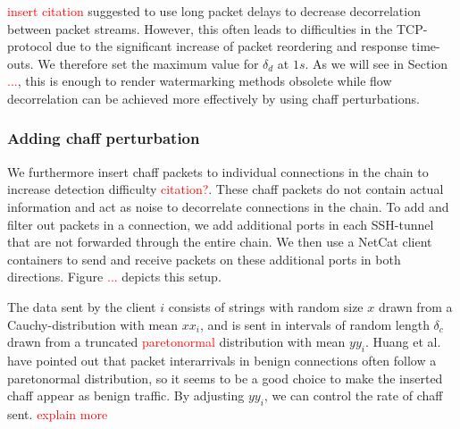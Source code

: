 \documentclass[runningheads]{llncs}\usepackage[]{graphicx}\usepackage[]{color}
\begin{document}
\textcolor{red}{insert citation} suggested to use long packet delays to decrease decorrelation between packet streams. However, this often leads to difficulties in the TCP-protocol due to the significant increase of packet reordering and response time-outs. We therefore set the maximum value for  $\delta_d$  at $1s$. As we will see in Section \textcolor{red}{...}, this is enough to render watermarking methods obsolete while flow decorrelation can be achieved more effectively by using chaff perturbations. 





\subsubsection{Adding chaff perturbation}\label{Sec:chaff_desc}

We furthermore insert chaff packets to individual connections in the chain to increase detection difficulty \textcolor{red}{citation?}. These chaff packets do not contain actual information and act as noise to decorrelate connections in the chain. To add and filter out packets in a connection, we add additional ports in each SSH-tunnel that are not forwarded through the entire chain.
We then use a NetCat client containers to send and receive packets on these additional ports in both directions. Figure \textcolor{red}{...} depicts this setup. 

The data sent by the client $i$ consists of strings with random size $x$ drawn from a Cauchy-distribution with mean $xx_i$, and is sent in intervals of random length $\delta_c$ drawn from a truncated \textcolor{red}{paretonormal} distribution with mean $yy_i$. Huang et al. \cite{huang2011detecting} have pointed out that packet interarrivals in benign connections often follow a paretonormal distribution, so it seems to be a good choice to make the inserted chaff appear as benign traffic. By adjusting $yy_i$, we can control the rate of chaff sent. \textcolor{red}{explain more}



 
\end{document}
